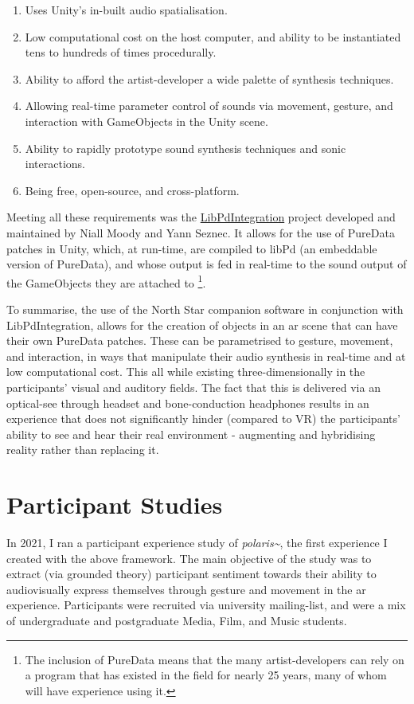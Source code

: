 \begin{enumerate}
    \item Uses Unity's in-built audio spatialisation.
    \item Low computational cost on the host computer, and ability to be instantiated tens to hundreds of times procedurally.
    \item Ability to afford the artist-developer a wide palette of synthesis techniques.
    \item Allowing real-time parameter control of sounds via movement, gesture, and interaction with GameObjects in the Unity scene.
    \item Ability to rapidly prototype sound synthesis techniques and sonic interactions.
    \item Being free, open-source, and cross-platform.
\end{enumerate}

Meeting all these requirements was the \href{https://github.com/LibPdIntegration/LibPdIntegration}{LibPdIntegration} project developed and maintained by Niall Moody and Yann Seznec. It allows for the use of PureData patches in Unity, which, at run-time, are compiled to libPd (an embeddable version of PureData), and whose output is fed in real-time to the sound output of the GameObjects they are attached to  \footnote{The inclusion of PureData means that the many artist-developers can rely on a program that has existed in the field for nearly 25 years, many of whom will have experience using it.}.

To summarise, the use of the North Star companion software in conjunction with LibPdIntegration, allows for the creation of objects in an \gls{ar} scene that can have their own PureData patches. These can be parametrised to gesture, movement, and interaction, in ways that manipulate their audio synthesis in real-time and at low computational cost. This all while existing three-dimensionally in the participants' visual and auditory fields. The fact that this is delivered via an optical-see through headset and bone-conduction headphones results in an experience that does not significantly hinder (compared to VR) the participants' ability to see and hear their real environment - augmenting and hybridising reality rather than replacing it.



\section{Participant Studies}\label{sec: polaris-study}
In 2021, I ran a participant experience study of \textit{polaris\textasciitilde{}}, the first experience I created with the above framework. The main objective of the study was to extract (via grounded theory) participant sentiment towards their ability to audiovisually express themselves through gesture and movement in the \gls{ar} experience. Participants were recruited via university mailing-list, and were a mix of undergraduate and postgraduate Media, Film, and Music students.


